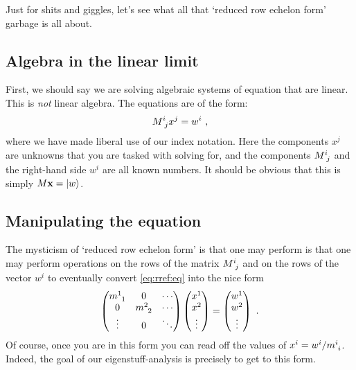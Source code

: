 \documentclass[12pt, oneside]{report}    %
\begin{document}
Just for shits and giggles, let's see what all that `reduced row echelon form' garbage is all about.

\subsection{Algebra in the linear limit}

First, we should say we are solving algebraic systems of equation that are linear. This is \emph{not} linear algebra. The equations are of the form:
\begin{align}
    M\aij{i}{j}x^j = w^i
    \ ,
    \label{eq:rref:eq}
\end{align}
where we have made liberal use of our index notation. Here the components $x^j$ are unknowns that you are tasked with solving for, and the components $M\aij{i}{j}$ and the right-hand side $w^i$ are all known numbers. It should be obvious that this is simply $M\mathbf{x} = \left|w\right\rangle$. 

\subsection{Manipulating the equation}

The mysticism of `reduced row echelon form' is that one may perform is that one may perform operations on the rows of the matrix $M\aij{i}{j}$ and on the rows of the vector $w^i$ to eventually convert \eqref{eq:rref:eq} into the nice form
\begin{align}
    \begin{pmatrix}
        m\aij{1}{1} & 0 & \cdots \\
        0 & m\aij{2}{2} & \cdots \\
        \vdots  &0 & \ddots 
    \end{pmatrix}
    \begin{pmatrix}
        x^1 \\
        x^2 \\
        \vdots
    \end{pmatrix}
    =
    \begin{pmatrix}
        w^1 \\
        w^2 \\
        \vdots 
    \end{pmatrix} \ .
\end{align}
Of course, once you are in this form you can read off the values of $x^i = w^i/m\aij{i}{i}$. Indeed, the goal of our eigenstuff-analysis is precisely to get to this form. 
\end{document}
